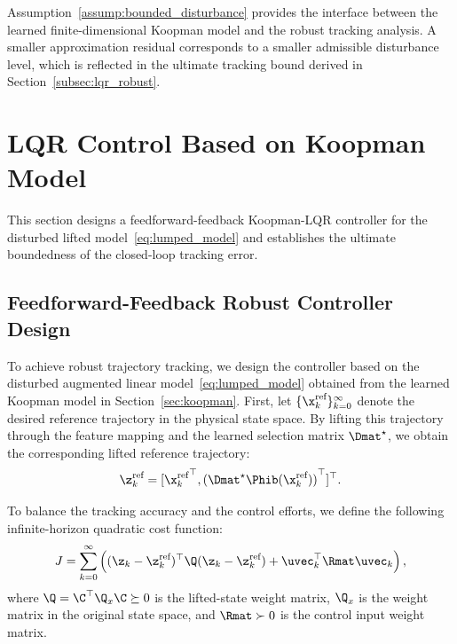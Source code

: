 Assumption~\ref{assump:bounded_disturbance} provides the interface between the learned finite-dimensional Koopman model and the robust tracking analysis. A smaller approximation residual corresponds to a smaller admissible disturbance level, which is reflected in the ultimate tracking bound derived in Section~\ref{subsec:lqr_robust}.


\section{LQR Control Based on Koopman Model}
\label{sec:lqr}

This section designs a feedforward-feedback Koopman-LQR controller for the disturbed lifted model~\eqref{eq:lumped_model} and establishes the ultimate boundedness of the closed-loop tracking error.

\subsection{Feedforward-Feedback Robust Controller Design}
\label{subsec:lqr_design}

To achieve robust trajectory tracking, we design the controller based on the disturbed augmented linear model~\eqref{eq:lumped_model} obtained from the learned Koopman model in Section~\ref{sec:koopman}.
First, let $\{\x_k^{\text{ref}}\}_{k=0}^{\infty}$ denote the desired reference trajectory in the physical state space. By lifting this trajectory through the feature mapping and the learned selection matrix $\Dmat^\star$, we obtain the corresponding lifted reference trajectory: 
\begin{equation}
\z_k^{\text{ref}} = [{\x_k^{\text{ref}}}^\top, {(\Dmat^\star\Phib(\x_k^{\text{ref}}))}^\top]^\top.
\end{equation}

To balance the tracking accuracy and the control efforts, we define the following infinite-horizon quadratic cost function:
\begin{equation}
\label{eq:lqr_cost}
J = \sum_{k=0}^{\infty} \left( (\z_k - \z_k^{\text{ref}})^\top \Q (\z_k - \z_k^{\text{ref}}) + \uvec_k^\top \Rmat \uvec_k \right),
\end{equation}
where $\Q = \C^\top \Q_x \C \succeq 0$ is the lifted-state weight matrix, $\Q_x$ is the weight matrix in the original state space, and $\Rmat \succ 0$ is the control input weight matrix.

